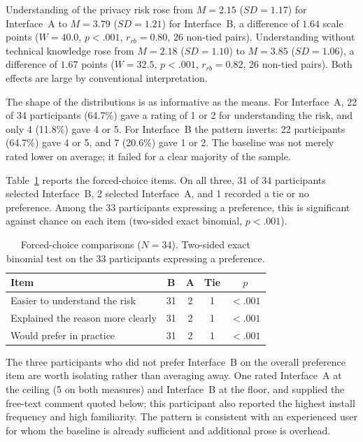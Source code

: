\documentclass[sigconf]{acmart}
\begin{document}
Understanding of the privacy risk rose from $M=2.15$ ($SD=1.17$) for
Interface~A to $M=3.79$ ($SD=1.21$) for Interface~B, a difference of $1.64$
scale points ($W=40.0$, $p<.001$, $r_{rb}=0.80$, 26 non-tied pairs).
Understanding without technical knowledge rose from $M=2.18$ ($SD=1.10$) to
$M=3.85$ ($SD=1.06$), a difference of $1.67$ points ($W=32.5$, $p<.001$,
$r_{rb}=0.82$, 26 non-tied pairs). Both effects are large by conventional
interpretation.

The shape of the distributions is as informative as the means. For
Interface~A, 22 of 34 participants (64.7\%) gave a rating of 1 or 2 for
understanding the risk, and only 4 (11.8\%) gave 4 or 5. For Interface~B
the pattern inverts: 22 participants (64.7\%) gave 4 or 5, and 7 (20.6\%)
gave 1 or 2. The baseline was not merely rated lower on average; it failed
for a clear majority of the sample.

Table~\ref{tab:choice} reports the forced-choice items. On all three, 31 of
34 participants selected Interface~B, 2 selected Interface~A, and 1
recorded a tie or no preference. Among the 33 participants expressing a
preference, this is significant against chance on each item (two-sided
exact binomial, $p<.001$).

\begin{table}[t]
\caption{Forced-choice comparisons ($N=34$). Two-sided exact binomial test
on the 33 participants expressing a preference.}
\label{tab:choice}
\small
\begin{tabular}{@{}lcccc@{}}
\toprule
\textbf{Item} & \textbf{B} & \textbf{A} & \textbf{Tie} & \textbf{$p$} \\
\midrule
Easier to understand the risk & 31 & 2 & 1 & $<.001$ \\
Explained the reason more clearly & 31 & 2 & 1 & $<.001$ \\
Would prefer in practice & 31 & 2 & 1 & $<.001$ \\
\bottomrule
\end{tabular}
\end{table}

The three participants who did not prefer Interface~B on the overall
preference item are worth isolating rather than averaging away. One rated
Interface~A at the ceiling (5 on both measures) and Interface~B at the
floor, and supplied the free-text comment quoted below; this participant
also reported the highest install frequency and high familiarity. The
pattern is consistent with an experienced user for whom the baseline is
already sufficient and additional prose is overhead.
\end{document}
